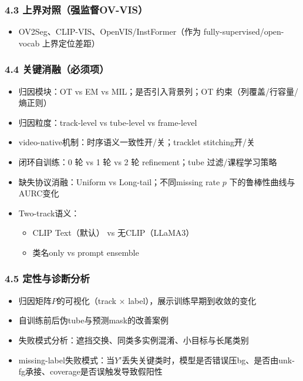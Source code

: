 \documentclass[UTF8]{ctexart}
\begin{document}
\subsubsection*{4.3 上界对照（强监督OV-VIS）}
\begin{itemize}
\item OV2Seg、CLIP-VIS、OpenVIS/InstFormer（作为 fully-supervised/open-vocab 上界定位差距）
\end{itemize}

\subsubsection*{4.4 关键消融（必须项）}
\begin{itemize}
\item 归因模块：OT vs EM vs MIL；是否引入背景列；OT 约束（列覆盖/行容量/熵正则）
\item 归因粒度：track-level vs tube-level vs frame-level
\item video-native机制：时序语义一致性开/关；tracklet stitching开/关
\item 闭环自训练：0 轮 vs 1 轮 vs 2 轮 refinement；tube 过滤/课程学习策略
\item 缺失协议消融：Uniform vs Long-tail；不同missing rate $p$ 下的鲁棒性曲线与AURC变化
\item Two-track语义：
\begin{itemize}
\begin{itemize}
\item CLIP Text（默认） vs 无CLIP（LLaMA3）
\item 类名only vs prompt ensemble
\end{itemize}
\end{itemize}
\end{itemize}

\subsubsection*{4.5 定性与诊断分析}
\begin{itemize}
\item 归因矩阵$P$的可视化（track × label），展示训练早期到收敛的变化
\item 自训练前后伪tube与预测mask的改善案例
\item 失败模式分析：遮挡交换、同类多实例混淆、小目标与长尾类别
\item missing-label失败模式：当$Y'$丢失关键类时，模型是否错误压bg、是否由unk-fg承接、coverage是否误触发导致假阳性
\end{itemize}
\end{document}
